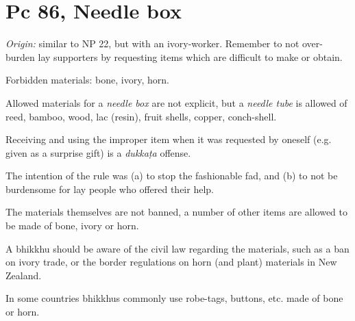 \section{Pc 86, Needle box}

\emph{Origin:} similar to NP 22, but with an ivory-worker. Remember to
not over-burden lay supporters by requesting items which are difficult
to make or obtain.

Forbidden materials: bone, ivory, horn.

Allowed materials for a \emph{needle box} are not explicit, but a
\emph{needle tube} is allowed of reed, bamboo, wood, lac (resin), fruit
shells, copper, conch-shell.

Receiving and using the improper item when it was requested by oneself
(e.g. given as a surprise gift) is a \emph{dukkaṭa} offense.

The intention of the rule was (a) to stop the fashionable fad, and (b)
to not be burdensome for lay people who offered their help.

The materials themselves are not banned, a number of other items are
allowed to be made of bone, ivory or horn.

A bhikkhu should be aware of the civil law regarding the materials, such
as a ban on ivory trade, or the border regulations on horn (and plant)
materials in New Zealand.

In some countries bhikkhus commonly use robe-tags, buttons, etc. made of
bone or horn.

